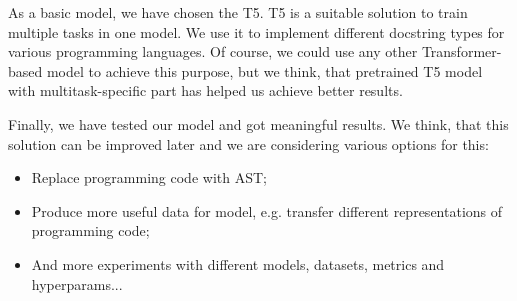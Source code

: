 \documentclass{article}
\begin{document}
As a basic model, we have chosen the T5. T5 is a suitable solution to train multiple tasks in one model. We use it to implement different docstring types for various programming languages. Of course, we could use any other Transformer-based model to achieve this purpose, but we think, that pretrained T5 model with multitask-specific part has helped us achieve better results.

Finally, we have tested our model and got meaningful results. We think, that this solution can be improved later and we are considering various options for this:
\begin{itemize}
    \item Replace programming code with AST;
    \item Produce more useful data for model, e.g. transfer different representations of programming code;
    \item And more experiments with different models, datasets, metrics and hyperparams...
\end{itemize}



\end{document}
